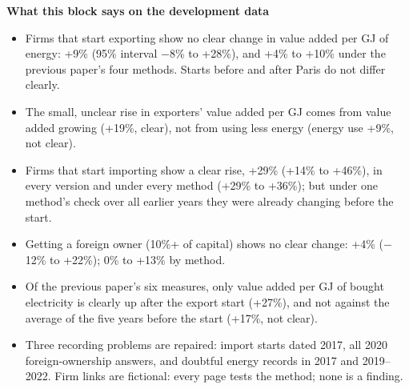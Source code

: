 \medskip
{\small\textbf{What this block says on the development data}}
\begin{itemize}\small
\item Firms that start exporting show no clear change in value added per GJ of energy: +9\% (95\% interval $-$8\% to +28\%), and
  +4\% to +10\% under the previous paper's four methods. Starts before and after Paris do not differ clearly.
\item The small, unclear rise in exporters' value added per GJ comes from value added growing (+19\%, clear), not from
  using less energy (energy use +9\%, not clear).
\item Firms that start importing show a clear rise, +29\% (+14\% to +46\%), in every version and under every method (+29\% to
  +36\%); but under one method's check over all earlier years they were already changing before the start.
\item Getting a foreign owner (10\%+ of capital) shows no clear change: +4\% ($-$12\% to +22\%); 0\% to +13\% by method.
\item Of the previous paper's six measures, only value added per GJ of bought electricity is clearly up after the export start
  (+27\%), and not against the average of the five years before the start (+17\%, not clear).
\item Three recording problems are repaired: import starts dated 2017, all 2020 foreign-ownership answers, and doubtful
  energy records in 2017 and 2019--2022. Firm links are fictional: every page tests the method; none is a finding.
\end{itemize}

